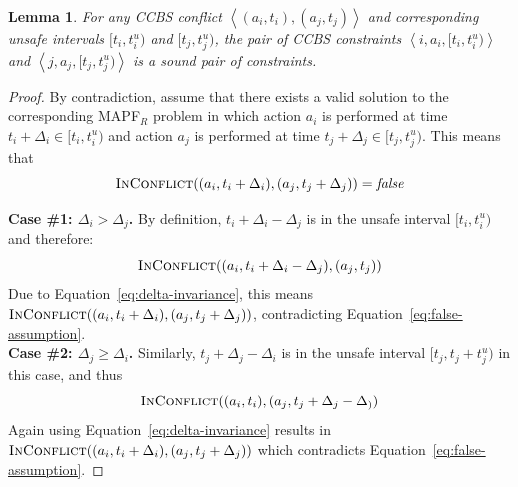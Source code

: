 \documentclass[review]{elsarticle}
\newtheorem{lemma}{Lemma}
\newcommand{\tuple}[1]{\ensuremath{\left \langle #1 \right \rangle }}
\newcommand{\ccbs}{\ac{CCBS}\xspace}
\newcommand{\mapfr}{\ac{MAPF}$_R$\xspace}
\newcommand{\false}{\textit{false}\xspace}
\newcommand{\inconflict}{\textsc{InConflict}\xspace}
\begin{document}
\begin{lemma}
For any \ccbs conflict $\tuple{(a_i, t_i), (a_j, t_j)}$ 
and corresponding unsafe intervals $[t_i,t^u_i)$
and $[t_j,t^u_j)$, 
the pair of \ccbs constraints 
$\tuple{i,a_i,[t_i,t^u_i)}$ and
$\tuple{j,a_j,[t_j,t^u_j)}$ 
is a sound pair of constraints.
\label{lem:sound}
\end{lemma}
\begin{proof}
By contradiction, assume that there exists a valid solution to the corresponding \mapfr problem 
in which action $a_i$ is performed at time $t_i+\Delta_i\in [t_i,t^u_i)$
and action $a_j$ is performed at time $t_j+\Delta_j\in [t_j,t^u_j)$. This means that
\begin{equation}
    \inconflict((a_i,t_i+\Delta_i),(a_j,t_j+\Delta_j))=\false
    \label{eq:false-assumption}
\end{equation}

\textbf{Case \#1: $\Delta_i>\Delta_j$.} 
By definition, $t_i+\Delta_i-\Delta_j$ is in the unsafe interval $[t_i,t_i^u)$ and therefore:
\begin{equation}
    \inconflict((a_i, t_i+\Delta_i-\Delta_j), (a_j,t_j))
\end{equation}
Due to Equation~\ref{eq:delta-invariance}, this means
$\inconflict((a_i, t_i+\Delta_i),(a_j,t_j+\Delta_j))$, contradicting Equation~\ref{eq:false-assumption}.\\ 

\textbf{Case \#2: $\Delta_j\geq\Delta_i$.}
Similarly, $t_j+\Delta_j-\Delta_i$ is in the unsafe interval $[t_j, t_j+t_j^u)$ in this case, and thus 
\begin{equation}
    \inconflict((a_i, t_i), (a_j,t_j+\Delta_j-\Delta_))
\end{equation}
Again using Equation~\ref{eq:delta-invariance} results in 
$\inconflict((a_i, t_i+\Delta_i),(a_j,t_j+\Delta_j))$ which contradicts Equation~\ref{eq:false-assumption}. 
\end{proof}
\end{document}
